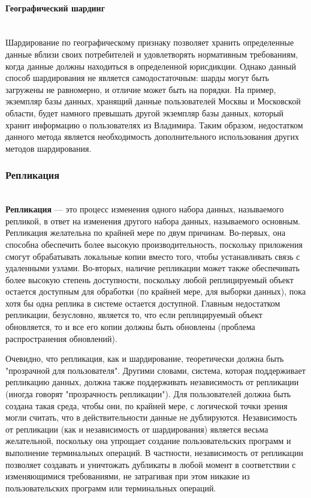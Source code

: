 \paragraph{Географический шардинг} ~\\
Шардирование по географическому признаку позволяет хранить определенные данные вблизи своих потребителей и
удовлетворять нормативным требованиям, когда данные должны находиться в определенной юрисдикции. Однако данный способ
шардирования не является самодостаточным: шарды могут быть загружены не равномерно, и отличие может быть на порядки.
На пример, экземпляр базы данных, хранящий данные пользователей Москвы и Московской области, будет намного превышать
другой экземпляр базы данных, который хранит информацию о пользователях из Владимира. Таким образом, недостатком
данного метода является необходимость дополнительного использования других методов шардирования.

\subsubsection{Репликация} ~\\
\textbf{Репликация} — это процесс изменения одного набора данных, называемого репликой, в ответ на изменения другого
набора данных, называемого основным. Репликация желательна по крайней мере по двум причинам. Во-первых, она способна
обеспечить более высокую производительность, поскольку приложения смогут обрабатывать локальные копии вместо того,
чтобы устанавливать связь с удаленными узлами. Во-вторых, наличие репликации может также обеспечивать более высокую
степень доступности, поскольку любой реплицируемый объект остается доступным для обработки (по крайней мере, для выборки
данных), пока хотя бы одна реплика в системе остается доступной. Главным недостатком репликации, безусловно, является
то, что если реплицируемый объект обновляется, то и все его копии должны быть обновлены (проблема распространения
обновлений).

Очевидно, что репликация, как и шардирование, теоретически должна быть "прозрачной для пользователя". Другими словами,
система, которая поддерживает репликацию данных, должна также поддерживать независимость от репликации (иногда говорят
"прозрачность репликации"). Для пользователей должна быть создана такая среда, чтобы они, по крайней мере, с логической
точки зрения могли считать, что в действительности данные не дублируются. Независимость от репликации (как и
независимость от шардирования) является весьма желательной, поскольку она упрощает создание пользовательских программ и
выполнение терминальных операций. В частности, независимость от репликации позволяет создавать и уничтожать дубликаты в
любой момент в соответствии с изменяющимися требованиями, не затрагивая при этом никакие из пользовательских программ
или терминальных операций.

